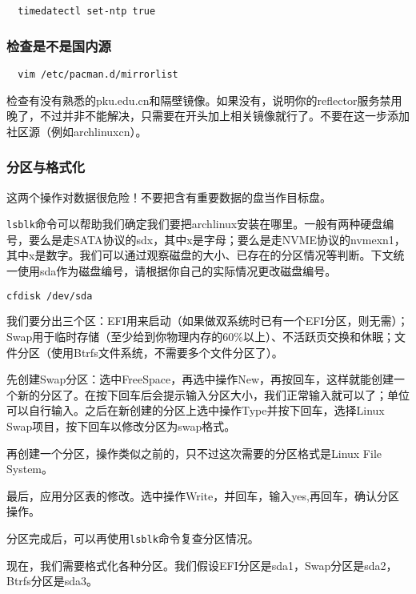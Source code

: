 \documentclass[../main.tex]{subfiles}
\begin{document}
\begin{lstlisting}
  timedatectl set-ntp true
\end{lstlisting}

\subsubsection{检查是不是国内源}

\begin{lstlisting}
  vim /etc/pacman.d/mirrorlist
\end{lstlisting}

检查有没有熟悉的pku.edu.cn和隔壁镜像。如果没有，说明你的reflector服务禁用晚了，不过并非不能解决，只需要在开头加上相关镜像就行了。不要在这一步添加社区源（例如archlinuxcn）。

\subsubsection{分区与格式化}

这两个操作对数据很危险！不要把含有重要数据的盘当作目标盘。

\texttt{lsblk}命令可以帮助我们确定我们要把archlinux安装在哪里。一般有两种硬盘编号，要么是走SATA协议的sdx，其中x是字母；要么是走NVME协议的nvmexn1，其中x是数字。我们可以通过观察磁盘的大小、已存在的分区情况等判断。下文统一使用sda作为磁盘编号，请根据你自己的实际情况更改磁盘编号。

\begin{lstlisting}[language=bash]
  cfdisk /dev/sda
\end{lstlisting}

我们要分出三个区：EFI用来启动（如果做双系统时已有一个EFI分区，则无需）；Swap用于临时存储（至少给到你物理内存的60\%以上）、不活跃页交换和休眠；文件分区（使用Btrfs文件系统，不需要多个文件分区了）。

先创建Swap分区：选中FreeSpace，再选中操作New，再按回车，这样就能创建一个新的分区了。在按下回车后会提示输入分区大小，我们正常输入就可以了；单位可以自行输入。之后在新创建的分区上选中操作Type并按下回车，选择Linux Swap项目，按下回车以修改分区为swap格式。

再创建一个分区，操作类似之前的，只不过这次需要的分区格式是Linux File System。

最后，应用分区表的修改。选中操作Write，并回车，输入yes,再回车，确认分区操作。

分区完成后，可以再使用\texttt{lsblk}命令复查分区情况。

现在，我们需要格式化各种分区。我们假设EFI分区是sda1，Swap分区是sda2，Btrfs分区是sda3。
\end{document}
